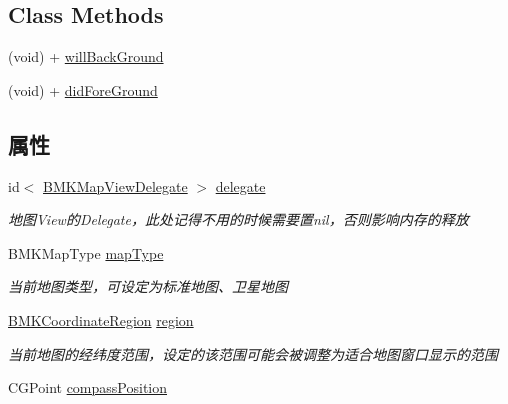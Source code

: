 \subsection*{Class Methods}
\begin{DoxyCompactItemize}
\item 
(void) + \hyperlink{interface_b_m_k_map_view_a2f7752221a3c2ba2682cddbcd351f0fc}{will\+Back\+Ground}
\item 
(void) + \hyperlink{interface_b_m_k_map_view_ae9e5519e547a14d2fc5479c28f724560}{did\+Fore\+Ground}
\end{DoxyCompactItemize}
\subsection*{属性}
\begin{DoxyCompactItemize}
\item 
\hypertarget{interface_b_m_k_map_view_a80806d05b9f82dcf5630110b5d20dc2c}{id$<$ \hyperlink{protocol_b_m_k_map_view_delegate-p}{B\+M\+K\+Map\+View\+Delegate} $>$ \hyperlink{interface_b_m_k_map_view_a80806d05b9f82dcf5630110b5d20dc2c}{delegate}}\label{interface_b_m_k_map_view_a80806d05b9f82dcf5630110b5d20dc2c}

\begin{DoxyCompactList}\small\item\em 地图\+View的\+Delegate，此处记得不用的时候需要置nil，否则影响内存的释放 \end{DoxyCompactList}\item 
\hypertarget{interface_b_m_k_map_view_add5778e2d3c080b0ae2ce63538082fea}{B\+M\+K\+Map\+Type \hyperlink{interface_b_m_k_map_view_add5778e2d3c080b0ae2ce63538082fea}{map\+Type}}\label{interface_b_m_k_map_view_add5778e2d3c080b0ae2ce63538082fea}

\begin{DoxyCompactList}\small\item\em 当前地图类型，可设定为标准地图、卫星地图 \end{DoxyCompactList}\item 
\hypertarget{interface_b_m_k_map_view_ae54e847bb82b4e087ced8dc399a2d020}{\hyperlink{struct_b_m_k_coordinate_region}{B\+M\+K\+Coordinate\+Region} \hyperlink{interface_b_m_k_map_view_ae54e847bb82b4e087ced8dc399a2d020}{region}}\label{interface_b_m_k_map_view_ae54e847bb82b4e087ced8dc399a2d020}

\begin{DoxyCompactList}\small\item\em 当前地图的经纬度范围，设定的该范围可能会被调整为适合地图窗口显示的范围 \end{DoxyCompactList}\item 
\hypertarget{interface_b_m_k_map_view_adad44db2dcfaa2d92e5eabef40f32bd8}{C\+G\+Point \hyperlink{interface_b_m_k_map_view_adad44db2dcfaa2d92e5eabef40f32bd8}{compass\+Position}}\label{interface_b_m_k_map_view_adad44db2dcfaa2d92e5eabef40f32bd8}


\end{DoxyCompactItemize}
